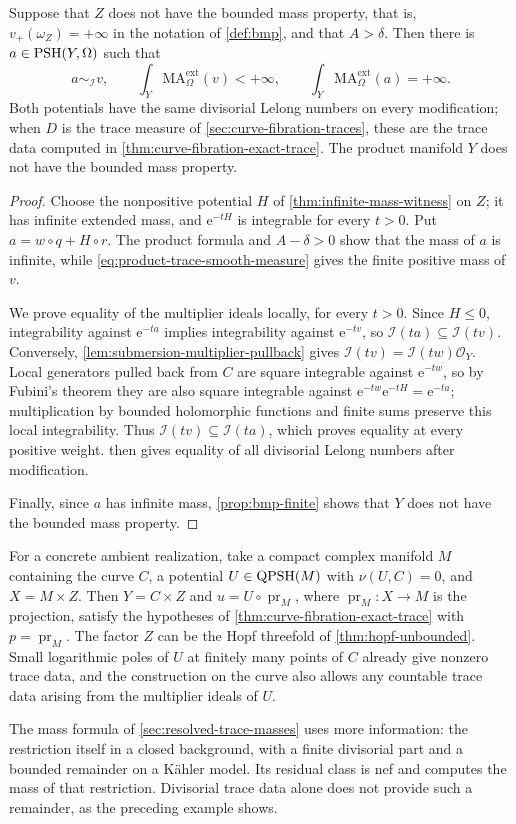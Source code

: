 \begin{proposition}\label{prop:exact-trace-infinite-representatives}
Suppose that $Z$ does not have the bounded mass property, that is, $v_+(\omega_Z)=+\infty$ in the notation of \cref{def:bmp}, and that $A>\delta$. Then there is $a\in\mathrm{PSH}(Y,\Omega)$ such that
\[
 a\sim_{\mathcal I}v,\qquad
 \int_Y\mathrm{MA}^{\mathrm{ext}}_\Omega(v)<+\infty,
 \qquad
 \int_Y\mathrm{MA}^{\mathrm{ext}}_\Omega(a)=+\infty.
\]
Both potentials have the same divisorial Lelong numbers on every modification; when $D$ is the trace measure of \cref{sec:curve-fibration-traces}, these are the trace data computed in \cref{thm:curve-fibration-exact-trace}. The product manifold $Y$ does not have the bounded mass property.
\end{proposition}
\begin{proof}
Choose the nonpositive potential $H$ of \cref{thm:infinite-mass-witness} on $Z$; it has infinite extended mass, and $\mathrm{e}^{-tH}$ is integrable for every $t>0$. Put $a=w\circ q+H\circ r$. The product formula and $A-\delta>0$ show that the mass of $a$ is infinite, while \eqref{eq:product-trace-smooth-measure} gives the finite positive mass of $v$.

We prove equality of the multiplier ideals locally, for every $t>0$. Since $H\leq0$, integrability against $\mathrm{e}^{-ta}$ implies integrability against $\mathrm{e}^{-tv}$, so $\mathcal I(ta)\subseteq\mathcal I(tv)$. Conversely, \cref{lem:submersion-multiplier-pullback} gives $\mathcal I(tv)=\mathcal I(tw)\mathcal O_Y$. Local generators pulled back from $C$ are square integrable against $\mathrm{e}^{-tw}$, so by Fubini's theorem they are also square integrable against $\mathrm{e}^{-tw}\mathrm{e}^{-tH}=\mathrm{e}^{-ta}$; multiplication by bounded holomorphic functions and finite sums preserve this local integrability. Thus $\mathcal I(tv)\subseteq\mathcal I(ta)$, which proves equality at every positive weight.  then gives equality of all divisorial Lelong numbers after modification.

Finally, since $a$ has infinite mass, \cref{prop:bmp-finite} shows that $Y$ does not have the bounded mass property.
\end{proof}

For a concrete ambient realization, take a compact complex manifold $M$ containing the curve $C$, a potential $U\in\mathrm{QPSH}(M)$ with $\nu(U,C)=0$, and $X=M\times Z$. Then $Y=C\times Z$ and $u=U\circ\operatorname{pr}_M$, where $\operatorname{pr}_M:X\to M$ is the projection, satisfy the hypotheses of \cref{thm:curve-fibration-exact-trace} with $p=\operatorname{pr}_M$. The factor $Z$ can be the Hopf threefold of \cref{thm:hopf-unbounded}. Small logarithmic poles of $U$ at finitely many points of $C$ already give nonzero trace data, and the construction on the curve also allows any countable trace data arising from the multiplier ideals of $U$.

The mass formula of \cref{sec:resolved-trace-masses} uses more information: the restriction itself in a closed background, with a finite divisorial part and a bounded remainder on a K\"ahler model. Its residual class is nef and computes the mass of that restriction. Divisorial trace data alone does not provide such a remainder, as the preceding example shows.
